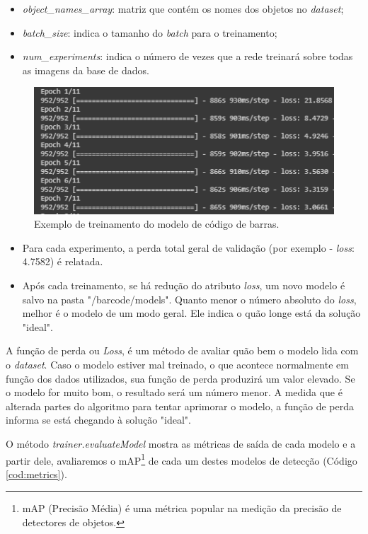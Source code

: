 \begin{itemize}
    \item \textit{object\_names\_array}: matriz que contém os nomes dos objetos no \textit{dataset};
    \item \textit{batch\_size}: indica o tamanho do \textit{batch} para o treinamento;
    \item \textit{num\_experiments}: indica o número de vezes que a rede treinará sobre todas as imagens da base de dados.
\end{itemize}

\begin{figure}[htbp]
	\centering
	\includegraphics[width=1\linewidth]{figuras/MachineLearning/barcodeTraining.png}
	\caption{Exemplo de treinamento do modelo de código de barras.}
	\label{fig:barTrain}
\end{figure}

\begin{itemize}
    \item Para cada experimento, a perda total geral de validação (por exemplo - \textit{loss}: 4.7582) é relatada.
    \item Após cada treinamento, se há redução do atributo \textit{loss}, um novo modelo é salvo na pasta "/barcode/models". Quanto menor o número absoluto do \textit{loss}, melhor é o modelo de um modo geral. Ele indica o quão longe está da solução "ideal". 
\end{itemize}

A função de perda ou \textit{Loss}, é um método de avaliar quão bem o modelo lida com o \textit{dataset}. Caso o modelo estiver mal treinado, o que acontece normalmente em função dos dados utilizados, sua função de perda produzirá um valor elevado. Se o modelo for muito bom, o resultado será um número menor. A medida que é alterada partes do  algoritmo para tentar aprimorar o modelo, a função de perda informa se está chegando à solução "ideal".

O método \textit{trainer.evaluateModel} mostra as métricas de saída de cada modelo e a partir dele, avaliaremos o mAP\footnote{mAP (Precisão Média) é uma métrica popular na medição da precisão de detectores de objetos.} de cada um destes modelos de detecção (Código \ref{cod:metrics}).

